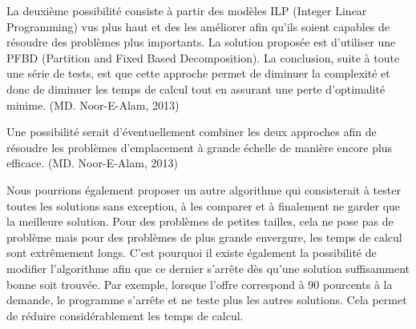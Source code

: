 \bigskip

La deuxième possibilité consiste à partir des modèles ILP (Integer Linear Programming) vus plus haut et des les améliorer afin qu'ils soient capables de résoudre des problèmes plus importants.
La solution proposée est d'utiliser une PFBD (Partition and Fixed Based Decomposition). La conclusion, suite à toute une série de tests, est que cette approche permet de diminuer la complexité et donc de diminuer les temps de calcul tout en assurant une perte d'optimalité minime. (MD. Noor-E-Alam, 2013)

\bigskip

Une possibilité serait d'éventuellement combiner les deux approches afin de résoudre les problèmes d'emplacement à grande échelle de manière encore plus efficace. (MD. Noor-E-Alam, 2013)

\bigskip

Nous pourrions également proposer un autre algorithme qui consisterait à tester toutes les solutions sans exception, à les comparer
et à finalement ne garder que la meilleure solution. Pour des problèmes de petites tailles, cela ne pose
pas de problème mais pour des problèmes de plus grande envergure, les temps de calcul sont extrêmement longs. C'est pourquoi il existe
également la possibilité de modifier l'algorithme afin que ce dernier s'arrête dès qu'une solution suffisamment bonne soit trouvée.
Par exemple, lorsque l'offre correspond à 90 pourcents à la demande, le programme s'arrête et ne teste plus les autres solutions. Cela permet
de réduire considérablement les temps de calcul.
